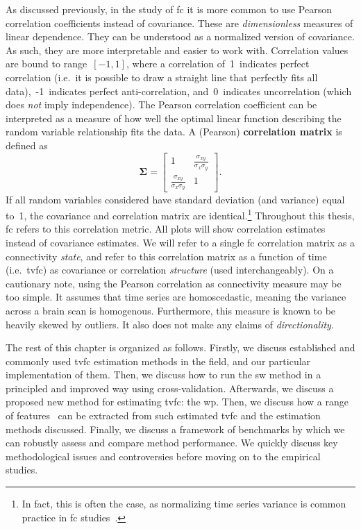 As discussed previously, in the study of \gls{fc} it is more common to use Pearson correlation coefficients instead of covariance.
These are \emph{dimensionless} measures of linear dependence.
They can be understood as a normalized version of covariance.
As such, they are more interpretable and easier to work with.
Correlation values are bound to range~$[-1,1]$, where a correlation of~1~indicates perfect correlation (i.e.~it is possible to draw a straight line that perfectly fits all data),~-1~indicates perfect anti-correlation, and~0~indicates uncorrelation (which does \emph{not} imply independence).
The Pearson correlation coefficient can be interpreted as a measure of how well the optimal linear function describing the random variable relationship fits the data.
A (Pearson) \textbf{correlation matrix} is defined as
\begin{equation}
  \label{eq:correlation-matrix}
  \mathbf{\Sigma} = \begin{bmatrix}
    1 & \frac{\sigma_{xy}}{\sigma_x\sigma_y} \\
    \frac{\sigma_{xy}}{\sigma_x\sigma_y} & 1
  \end{bmatrix}.
\end{equation}
If all random variables considered have standard deviation (and variance) equal to~1, the covariance and correlation matrix are identical.\footnote{In fact, this is often the case, as normalizing time series variance is common practice in \gls{fc} studies~\parencite[see e.g.][]{Beckmann2004, Allen2014}.}
Throughout this thesis, \gls{fc} refers to this correlation metric.
All plots will show correlation estimates instead of covariance estimates.
%
We will refer to a single \gls{fc} correlation matrix as a connectivity \emph{state}, and refer to this correlation matrix as a function of time (i.e.~\gls{tvfc}) as covariance or correlation \emph{structure} (used interchangeably).
%
On a cautionary note, using the Pearson correlation as connectivity measure may be too simple.
It assumes that time series are homoscedastic, meaning the variance across a brain scan is homogenous.
Furthermore, this measure is known to be heavily skewed by outliers.
It also does not make any claims of \emph{directionality}.

The rest of this chapter is organized as follows.
Firstly, we discuss established and commonly used \gls{tvfc} estimation methods in the field, and our particular implementation of them.
Then, we discuss how to run the \gls{sw} method in a principled and improved way using cross-validation.
Afterwards, we discuss a proposed new method for estimating \gls{tvfc}: the \gls{wp}.
Then, we discuss how a range of features~\parencite[or \emph{biomarkers} as they are often called in the context of neuroimaging, see e.g.][]{Woo2017, Douw2022} can be extracted from such estimated \gls{tvfc} and the estimation methods discussed.
%
Finally, we discuss a framework of benchmarks by which we can robustly assess and compare method performance.
%
We quickly discuss key methodological issues and controversies before moving on to the empirical studies.
